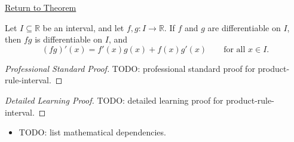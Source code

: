 \newpage
{}
\label{prf:product-rule-interval}

\begin{remark*}[Return]
\hyperref[thm:product-rule-interval]{Return to Theorem}
\end{remark*}

\begin{theorem*}
Let $I \subseteq \mathbb{R}$ be an interval, and let $f, g : I \to \mathbb{R}$. If $f$ and $g$ are differentiable on $I$, then $fg$ is differentiable on $I$, and
\[
(fg)'(x) = f'(x)g(x) + f(x)g'(x) \qquad \text{for all } x \in I.
\]
\end{theorem*}

\begin{proof}[Professional Standard Proof]
\LRAProofBodyStart
TODO: professional standard proof for product-rule-interval.
\end{proof}

\begin{proof}[Detailed Learning Proof]
\LRAProofBodyStart
TODO: detailed learning proof for product-rule-interval.
\end{proof}

\begin{remark*}
\end{remark*}

\begin{dependencies}
\begin{itemize}
  \item TODO: list mathematical dependencies.
\end{itemize}
\end{dependencies}

\clearpage
